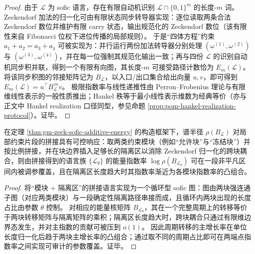 \begin{proof}
由于 \(\mathcal{L}\) 为 sofic 语言，存在有限自动机识别 \(\mathcal{L}\cap\{0,1\}^m\) 的长度-\(m\) 词。
Zeckendorf 加法的归一化可由有限状态同步转导器实现：逐位读取两条合法 Zeckendorf 数位并维护有限 carry 状态，输出规范化的 Zeckendorf 数位（该有限性来自 Fibonacci 位权下进位传播的局部规则）。
于是“四体方程”约束 \(a_1+a_2=a_3+a_4\) 可被实现为：并行运行两份加法转导器分别处理 \((\omega^{(1)},\omega^{(2)})\) 与 \((\omega^{(3)},\omega^{(4)})\)，并在每一位强制其规范化输出一致；再与四份 \(\mathcal{L}\) 的识别自动机同步积并联，得到一个有限有向图，其长度-\(m\) 可接受路径计数恰为 \(E_m(\mathcal{L})\)。
将该同步积图的邻接矩阵记为 \(B_{\mathcal{L}}\)，以入口/出口集合给出向量 \(u,v\)，即可得到 \(E_m(\mathcal{L})=u^\top B_{\mathcal{L}}^{\,m}v\)。
极限指数率与线性递推性由 Perron--Frobenius 理论与有限维线性表示的一般性质推出；Hankel 秩等于最小线性表示维数为经典等价（亦与正文中 Hankel realization 口径同型，参见命题 \ref{prop:pom-hankel-realization-protocol}）。证毕。
\end{proof}

\begin{proposition}\label{prop:gm-energy-rate-tunable}
在定理 \ref{thm:gm-zeck-sofic-additive-energy} 的构造框架下，谱半径 \(\rho(B_{\mathcal{L}})\) 对局部约束片段的拼接具有可控响应：取两类约束模块（例如“允许块”与“冻结块”）并按比例拼接，并在块边界插入足够长的隔离区以消除 Zeckendorf 归一化的跨块耦合，则由拼接得到的语言族 \(\{\mathcal{L}_\theta\}\) 的能量指数率
\(\log\rho(B_{\mathcal{L}_\theta})\)
可在一段非平凡区间内被调参覆盖，且在隔离区长度趋大时其指数率渐近为各模块指数率的凸组合。
\end{proposition}

\begin{proof}
将“模块 + 隔离区”的拼接语言实现为一个循环型 sofic 图：图由两块强连通子图（对应两类模块）与一段确定性隔离路径串接而成，且循环内两块出现的长度占比由参数 \(\theta\) 控制。
对相应的能量核矩阵 \(B_{\mathcal{L}_\theta}\)，其在一个完整周期上的转移等价于两块转移矩阵与隔离矩阵的乘积；隔离区长度趋大时，跨块耦合只通过有限维边界态发生，并对主指数的贡献可被压到 \(o(1)\)。
因此周期转移的主增长率在单位长度归一化后趋于两块主增长率的凸组合；通过取不同的周期占比即可在两端点指数率之间实现可审计的参数覆盖。证毕。
\end{proof}

